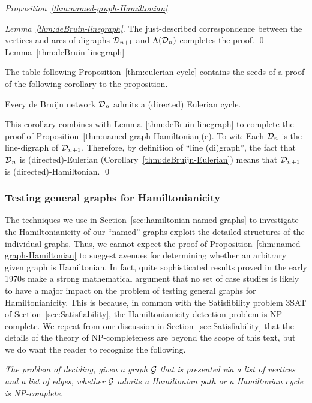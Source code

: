 \begin{proof}[Proposition~\ref{thm:named-graph-Hamiltonian}]
\begin{proof}[Lemma~\ref{thm:deBruin-linegraph}]
\smallskip

The just-described correspondence between the vertices and arcs of digraphs $\mbox{$\cal D$}_{n+1}$ and $\Lambda(\mbox{$\cal D$}_n)$ completes the proof.  \qed-Lemma~\ref{thm:deBruin-linegraph}
\end{proof}

\medskip

  

The table following Proposition~\ref{thm:eulerian-cycle} contains the seeds of a proof of the following corollary to the proposition.

\begin{corol}
\label{thm:deBruijn-Eulerian}
Every de Bruijn network $\mbox{$\cal D$}_n$ admits a (directed) Eulerian cycle.
\end{corol}

This corollary combines with Lemma~\ref{thm:deBruin-linegraph} to complete the proof of 
Proposition~\ref{thm:named-graph-Hamiltonian}(e).  To wit:  Each $\mbox{$\cal D$}_n$ is the line-digraph of  $\mbox{$\cal D$}_{n+1}$.  Therefore, by definition of  ``line (di)graph'', the fact that $\mbox{$\cal D$}_n$ is (directed)-Eulerian
(Corollary~\ref{thm:deBruijn-Eulerian}) means that $\mbox{$\cal D$}_{n+1}$ is (directed)-Hamiltonian.  \qed
\end{proof}


\subsubsection{Testing general graphs for Hamiltonianicity}
\label{sec:Hamiltonian-unweighted}

The techniques we use in Section~\ref{sec:hamiltonian-named-graphs} to investigate the Hamiltonianicity of our ``named'' graphs exploit the detailed structures of the individual graphs.  Thus, we cannot expect the proof of Proposition~\ref{thm:named-graph-Hamiltonian} to suggest avenues for determining whether an arbitrary given graph is Hamiltonian.  In fact, quite sophisticated results proved in the early 1970s make a strong mathematical argument that no set of case studies is likely to have a major impact on the problem of testing general graphs for Hamiltonianicity.  This is because, in common with the Satisfibility problem {\sf 3SAT} of Section~\ref{sec:Satisfiability}, the Hamiltonianicity-detection problem is {\sf NP}-complete.  We repeat from our discussion in Section~\ref{sec:Satisfiability} that the details of the theory of {\sf NP}-completeness are beyond the scope of this text, but we do want the reader to recognize the following.
\begin{description}
\item
{\it The problem of deciding, given a graph $\mbox{$\cal G$}$ that is presented via a list of vertices and a list of edges, whether $\mbox{$\cal G$}$ admits a Hamiltonian path or a Hamiltonian cycle is {\sf NP}-complete.}
\end{description}



